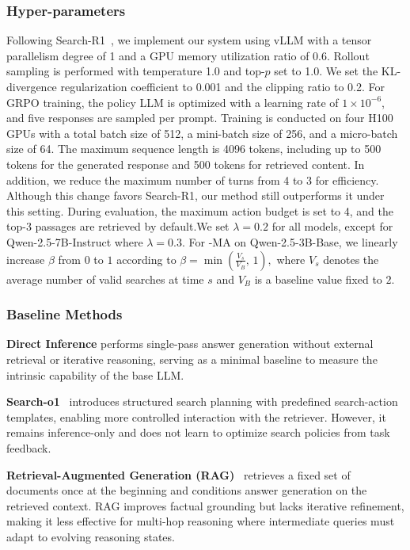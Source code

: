 \subsubsection{Hyper-parameters}\label{sec:add_hyp}
Following Search-R1~\cite{jin2025search}, we implement our system using vLLM with a tensor parallelism degree of 1 and a GPU memory utilization ratio of 0.6. Rollout sampling is performed with temperature 1.0 and top-$p$ set to 1.0. We set the KL-divergence regularization coefficient to 0.001 and the clipping ratio to 0.2. For GRPO training, the policy LLM is optimized with a learning rate of $1\times10^{-6}$, and five responses are sampled per prompt. Training is conducted on four H100 GPUs with a total batch size of 512, a mini-batch size of 256, and a micro-batch size of 64. The maximum sequence length is 4096 tokens, including up to 500 tokens for the generated response and 500 tokens for retrieved content. In addition, we reduce the maximum number of turns from 4 to 3 for efficiency. Although this change favors Search-R1, our method still outperforms it under this setting. During evaluation, the maximum action budget is set to 4, and the top-3 passages are retrieved by default.We set $\lambda = 0.2$ for all models, except for Qwen-2.5-7B-Instruct where $\lambda = 0.3$. For \ours{}-MA on Qwen-2.5-3B-Base, we linearly increase $\beta$ from $0$ to $1$ according to
$ \beta = \min\!\left(\frac{V_s}{V_B},\, 1\right), $
where $V_s$ denotes the average number of valid searches at time $s$ and $V_B$ is a baseline value fixed to $2$.

\subsubsection{Baseline Methods}\label{sec:d_bm}
\textbf{Direct Inference} performs single-pass answer generation without external retrieval or iterative reasoning, serving as a minimal baseline to measure the intrinsic capability of the base LLM.

\textbf{Search-o1}~\cite{li2025search} introduces structured search planning with predefined search-action templates, enabling more controlled interaction with the retriever. However, it remains inference-only and does not learn to optimize search policies from task feedback.

\textbf{Retrieval-Augmented Generation (RAG)}~\cite{lewis2020retrieval} retrieves a fixed set of documents once at the beginning and conditions answer generation on the retrieved context. RAG improves factual grounding but lacks iterative refinement, making it less effective for multi-hop reasoning where intermediate queries must adapt to evolving reasoning states.

